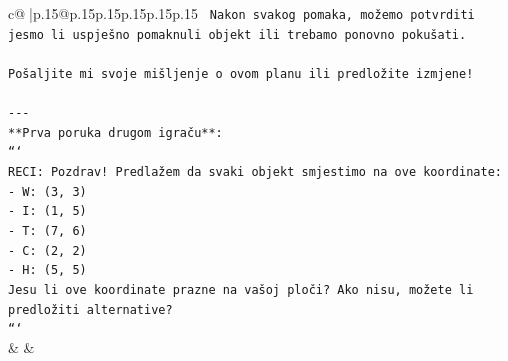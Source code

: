 \documentclass{article}
\begin{document}
{\begin{supertabular}{c@{$\;$}|p{.15\linewidth}@{}p{.15\linewidth}p{.15\linewidth}p{.15\linewidth}p{.15\linewidth}p{.15\linewidth}}
{{{\texttt{   Nakon svakog pomaka, možemo potvrditi jesmo li uspješno pomaknuli objekt ili trebamo ponovno pokušati.} \\
\\ 
\texttt{Pošaljite mi svoje mišljenje o ovom planu ili predložite izmjene!} \\
\\ 
\texttt{{-}{-}{-}} \\
\texttt{**Prva poruka drugom igraču**:} \\
\texttt{```} \\
\texttt{RECI: Pozdrav! Predlažem da svaki objekt smjestimo na ove koordinate:} \\
\texttt{{-} W: (3, 3)} \\
\texttt{{-} I: (1, 5)} \\
\texttt{{-} T: (7, 6)} \\
\texttt{{-} C: (2, 2)} \\
\texttt{{-} H: (5, 5)} \\
\texttt{Jesu li ove koordinate prazne na vašoj ploči? Ako nisu, možete li predložiti alternative?} \\
\texttt{```} \\
            }
        }
    }
    & & \\ \\


\end{supertabular}}
\end{document}
